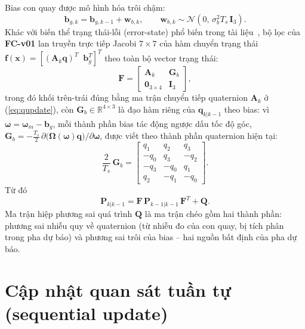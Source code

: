 Bias con quay được mô hình hóa trôi chậm:
\begin{equation}
\mathbf{b}_{g,k} = \mathbf{b}_{g,k-1} + \mathbf{w}_{b,k}, \qquad \mathbf{w}_{b,k} \sim \mathcal{N}(0,\, \sigma_b^2 T_s\, \mathbf{I}_3).
\end{equation}
Khác với biến thể trạng thái-lỗi (error-state) phổ biến trong tài liệu~\cite{sola2017}, bộ lọc của \textbf{FC-v01} lan truyền trực tiếp Jacobi $7\times 7$ của hàm chuyển trạng thái $\mathbf{f}(\mathbf{x}) = \left[\left(\mathbf{A}_k\mathbf{q}\right)^{T} \;\; \mathbf{b}_g^{T}\right]^{T}$ theo toàn bộ vector trạng thái:
\begin{equation}
\mathbf{F} =
\begin{bmatrix}
\mathbf{A}_k & \mathbf{G}_b \\
\mathbf{0}_{3\times 4} & \mathbf{I}_3
\end{bmatrix},
\label{eq:F}
\end{equation}
trong đó khối trên-trái đúng bằng ma trận chuyển tiếp quaternion $\mathbf{A}_k$ ở (\ref{eq:qupdate}), còn $\mathbf{G}_b \in \mathbb{R}^{4\times 3}$ là đạo hàm riêng của $\mathbf{q}_{k|k-1}$ theo bias: vì $\boldsymbol\omega = \boldsymbol\omega_m - \mathbf{b}_g$, mỗi thành phần bias tác động ngược dấu tốc độ góc, $\mathbf{G}_b = -\tfrac{T_s}{2}\,\partial\bigl(\boldsymbol\Omega(\boldsymbol\omega)\mathbf{q}\bigr)/\partial\boldsymbol\omega$, được viết theo thành phần quaternion hiện tại:\begin{equation}
\dfrac{2}{T_s}\,\mathbf{G}_b =
\begin{bmatrix}
q_1 & q_2 & q_3 \\
-q_0 & q_3 & -q_2 \\
-q_3 & -q_0 & q_1 \\
q_2 & -q_1 & -q_0
\end{bmatrix}.
\end{equation}
Từ đó
\begin{equation}
\mathbf{P}_{k|k-1} = \mathbf{F}\, \mathbf{P}_{k-1|k-1}\, \mathbf{F}^{T} + \mathbf{Q}.
\end{equation}
Ma trận hiệp phương sai quá trình $\mathbf{Q}$ là ma trận chéo gồm hai thành phần: phương sai nhiễu quy về quaternion (từ nhiễu đo của con quay, bị tích phân trong pha dự báo) và phương sai trôi của bias -- hai nguồn bất định của pha dự báo.

\section{Cập nhật quan sát tuần tự (sequential update)}
\label{sec:ekf-seq}

